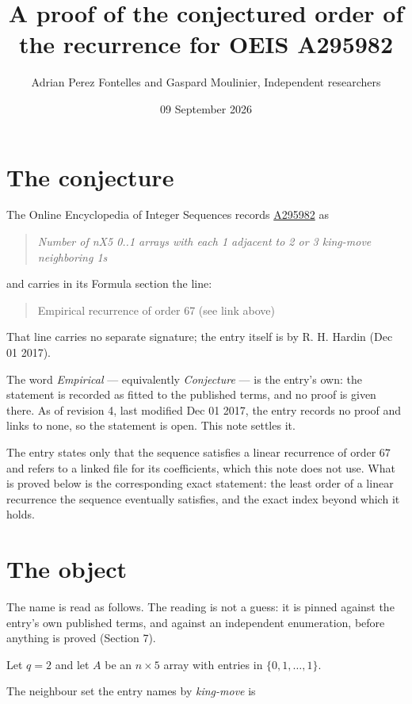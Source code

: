 \documentclass[11pt]{article}
\title{A proof of the conjectured order of the recurrence for OEIS A295982}
\author{Adrian Perez Fontelles and Gaspard Moulinier, Independent researchers}
\date{09 September 2026}
\theoremstyle{definition}
\begin{document}
\maketitle
\section{The conjecture}

The Online Encyclopedia of Integer Sequences records \href{https://oeis.org/A295982}{A295982} as

\begin{quote}\itshape Number of nX5 0..1 arrays with each 1 adjacent to 2 or 3 king-move neighboring 1s\end{quote}

and carries in its Formula section the line:

\begin{quote}\ttfamily Empirical recurrence of order 67 (see link above)\end{quote}

That line carries no separate signature; the entry itself is by R. H. Hardin (Dec 01 2017).

The word {\itshape Empirical} --- equivalently {\itshape Conjecture} --- is the entry's own: the statement is recorded as fitted to the published terms, and no proof is given there. As of revision 4, last modified Dec 01 2017, the entry records no proof and links to none, so the statement is open. This note settles it.

The entry states only that the sequence satisfies a linear recurrence of order $67$ and refers to a linked file for its coefficients, which this note does not use. What is proved below is the corresponding exact statement: the least order of a linear recurrence the sequence eventually satisfies, and the exact index beyond which it holds.

\section{The object}

The name is read as follows. The reading is not a guess: it is pinned against the entry's own published terms, and against an independent enumeration, before anything is proved (Section 7).

Let $q = 2$ and let $A$ be an $n \times 5$ array with entries in $\{0,1,\dots,1\}$.

The neighbour set the entry names by {\itshape king-move} is
\end{document}

